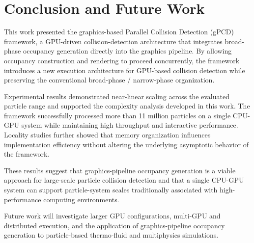 \section{Conclusion and Future Work}

This work presented the graphics-based Parallel Collision Detection
(gPCD) framework, a GPU-driven collision-detection architecture that
integrates broad-phase occupancy generation directly into the graphics
pipeline. By allowing occupancy construction and rendering to proceed
concurrently, the framework introduces a new execution architecture for
GPU-based collision detection while preserving the conventional
broad-phase / narrow-phase organization.

Experimental results demonstrated near-linear scaling across the
evaluated particle range and supported the complexity analysis
developed in this work. The framework successfully processed more than
11 million particles on a single CPU-GPU system while maintaining high
throughput and interactive performance. Locality studies further showed
that memory organization influences implementation efficiency without
altering the underlying asymptotic behavior of the framework.

These results suggest that graphics-pipeline occupancy generation is a
viable approach for large-scale particle collision detection and that a
single CPU-GPU system can support particle-system scales traditionally
associated with high-performance computing environments.

Future work will investigate larger GPU configurations, multi-GPU and
distributed execution, and the application of graphics-pipeline
occupancy generation to particle-based thermo-fluid and multiphysics
simulations.


